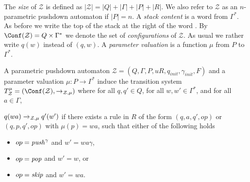\par\noindent\ignorespacesafterend
The {\em size} of $\mathcal{Z}$ is defined as
$|\mathcal{Z}| = |Q| + |\Gamma| + |P| + |R| $.
We also refer to $\mathcal{Z}$ as an $n$-parametric pushdown automaton if $|P| = n$.
A {\em stack content} is a word from $ \Gamma^*$. 
As before we write the top
of the stack at the right of the word%
. 
By $\Conf(\mathcal{Z})=Q\times  \Gamma^*$ we denote the set of
{\em configurations} of $\mathcal{Z}$. As usual we rather write $q(w)$ instead of $(q, w)$.
A {\em parameter valuation} is a function $\mu$ from $P$ to $\Gamma^*$.

\begin{samepage}
A parametric pushdown automaton  $\mathcal{Z}= (Q, \Gamma, P,u R, q_{init}, \gamma_{init},F)$ 
and a parameter valuation $\mu: P\rightarrow \Gamma^*$ induce the 
transition system  
$T_{\mathcal{Z}}^{\mu} = (\Conf(\mathcal{Z}), 
\rightarrow_{\mathcal{Z},\mu})$ where
for all $ q, q'  \in  Q$, 
for all $ w,w' \in \Gamma^* $, and 
for all $ a  \in  \Gamma$, 

$q(wa) \xrightarrow{%
}_{\mathcal{Z},\mu} q'(w')$
if there exists a rule in $R$
 of the form $(q,a,q', op)$ or $(q,p,q', op)$ with $\mu(p)=wa$,
such that
either of the following holds
\begin{itemize}
\item $ op = \text{\textit{push}}^\gamma$ and $w' = wa\gamma$,

\item $ op = \text{\textit{pop}}$ and $w' = w$, or

\item $ op = \text{\textit{skip}}$ and $w' = wa$.
\end{itemize}
\end{samepage}



